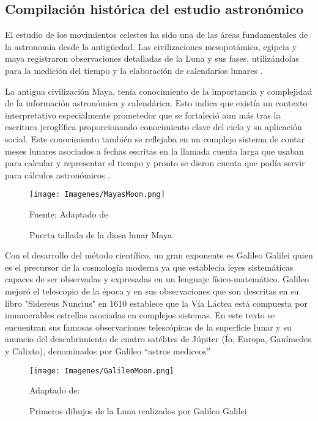 \subsection*{Compilación histórica del estudio astronómico}
El estudio de los movimientos celestes ha sido una de las áreas fundamentales de la astronomía desde la antigüedad. 
Las civilizaciones mesopotámica, egipcia y maya registraron observaciones detalladas de la Luna y sus fases, utilizándolas para
la medición del tiempo y la elaboración de calendarios lunares \cite{antigua}.

La antigua civilización Maya, tenía conocimiento de la importancia y complejidad de la información
astronómica y calendárica. Esto indica que existía un contexto interpretativo especialmente prometedor que se 
fortaleció aun más tras la escritura jeroglífica proporcionando conocimiento clave del cielo y su aplicación social. Este conocimiento también
se reflejaba en un complejo sistema de contar meses lunares asociados a fechas escritas en la llamada cuenta larga que usaban para calcular y representar
el tiempo y pronto se dieron cuenta que podía servir para cálculos astronómicos \cite{maya}.


\begin{figure}[h]
    \texttt{[image: Imagenes/MayasMoon.png]}
    \centering
    \caption{Puerta tallada de la diosa lunar Maya}{Fuente: Adaptado de \cite{ixchel}}
\end{figure}


Con el desarrollo del método científico, un gran exponente es Galileo Galilei quien es el precursor de la cosmología moderna ya que establecía
leyes sistemáticas capaces de ser observadas y expresadas en un lenguaje físico-matemático. Galileo mejoró el telescopio de la época y en sus observaciones
que son descritas en su libro "Sidereus Nuncius" \cite{sidereus} en 1610 establece que la Vía Láctea está compuesta por innumerables estrellas asociadas en complejos sistemas. En este texto se encuentran sus famosas observaciones telescópicas de la superficie lunar
y su anuncio del descubrimiento de cuatro satélites de Júpiter
(Ío, Europa, Ganímedes y Calixto), denominados por Galileo
“astros mediceos”


\begin{figure}[h]
    \texttt{[image: Imagenes/GalileoMoon.png]}
    \centering
    \caption{Primeros dibujos de la Luna realizados por Galileo Galilei}{ Adaptado de: \cite{bbc}}

\end{figure}

